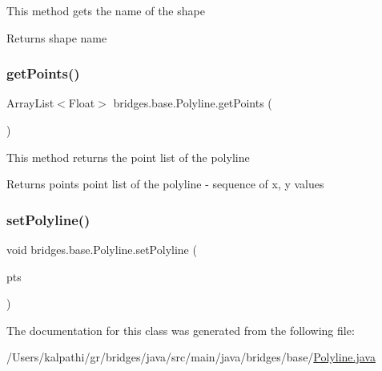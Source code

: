 This method gets the name of the shape

\begin{DoxyReturn}{Returns}
shape name 
\end{DoxyReturn}
\mbox{\label{classbridges_1_1base_1_1_polyline_ae610d680975558db90a06949991583f8}} 
\subsubsection{\texorpdfstring{getPoints()}{getPoints()}}
{\footnotesize\ttfamily Array\+List$<$Float$>$ bridges.\+base.\+Polyline.\+get\+Points (\begin{DoxyParamCaption}{ }\end{DoxyParamCaption})}

This method returns the point list of the polyline

\begin{DoxyReturn}{Returns}
points point list of the polyline -\/ sequence of x, y values 
\end{DoxyReturn}
\mbox{\label{classbridges_1_1base_1_1_polyline_a3fec0c95e9f26b173cba105bd39e9df1}} 
\subsubsection{\texorpdfstring{setPolyline()}{setPolyline()}}
{\footnotesize\ttfamily void bridges.\+base.\+Polyline.\+set\+Polyline (\begin{DoxyParamCaption}\item[{Array\+List$<$ Float $>$}]{pts }\end{DoxyParamCaption})}



The documentation for this class was generated from the following file\+:\begin{DoxyCompactItemize}
\item 
/\+Users/kalpathi/gr/bridges/java/src/main/java/bridges/base/\mbox{\hyperlink{_polyline_8java}{Polyline.\+java}}\end{DoxyCompactItemize}
